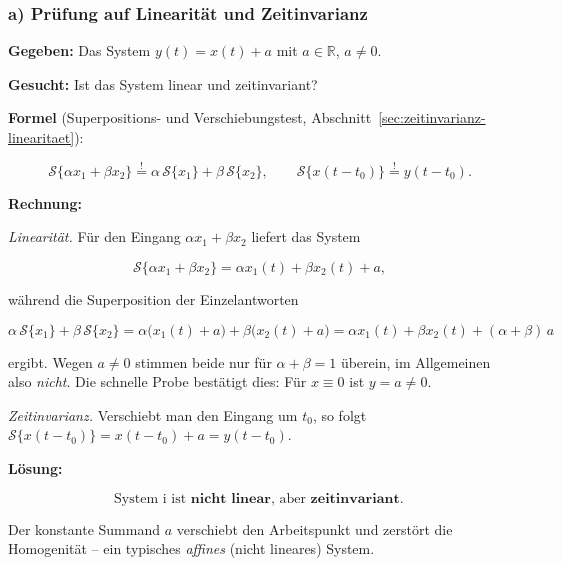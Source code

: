 \subsubsection*{a) Prüfung auf Linearität und Zeitinvarianz}

\begin{beispiel}

\textbf{Gegeben:} Das System $y(t) = x(t) + a$ mit $a \in \mathbb{R}$, $a \neq 0$.

\textbf{Gesucht:} Ist das System linear und zeitinvariant?

\textbf{Formel} (Superpositions- und Verschiebungstest,
Abschnitt~\ref{sec:zeitinvarianz-linearitaet}):

$$
\mathcal{S}\{\alpha x_1 + \beta x_2\} \overset{!}{=} \alpha\,\mathcal{S}\{x_1\} + \beta\,\mathcal{S}\{x_2\},
\qquad
\mathcal{S}\{x(t - t_0)\} \overset{!}{=} y(t - t_0).
$$

\textbf{Rechnung:}

\emph{Linearität.} Für den Eingang $\alpha x_1 + \beta x_2$ liefert das System

$$
\mathcal{S}\{\alpha x_1 + \beta x_2\} = \alpha x_1(t) + \beta x_2(t) + a,
$$

während die Superposition der Einzelantworten

$$
\alpha\,\mathcal{S}\{x_1\} + \beta\,\mathcal{S}\{x_2\}
= \alpha\big(x_1(t) + a\big) + \beta\big(x_2(t) + a\big)
= \alpha x_1(t) + \beta x_2(t) + (\alpha + \beta)\,a
$$

ergibt. Wegen $a \neq 0$ stimmen beide nur für $\alpha + \beta = 1$ überein, im
Allgemeinen also \emph{nicht}. Die schnelle Probe bestätigt dies: Für $x \equiv 0$
ist $y = a \neq 0$.

\emph{Zeitinvarianz.} Verschiebt man den Eingang um $t_0$, so folgt
$\mathcal{S}\{x(t - t_0)\} = x(t - t_0) + a = y(t - t_0)$.

\textbf{Lösung:}

$$
\boxed{\;\text{System i ist } \textbf{nicht linear}, \text{ aber } \textbf{zeitinvariant.}\;}
$$

Der konstante Summand $a$ verschiebt den Arbeitspunkt und zerstört die
Homogenität -- ein typisches \emph{affines} (nicht lineares) System.

\end{beispiel}

